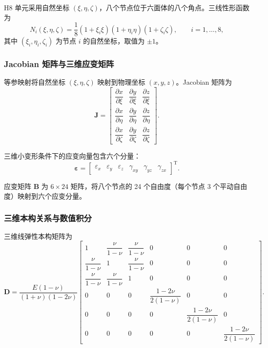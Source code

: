 \documentclass[UTF8,a4paper,zihao=-4]{ctexart}
\newcommand{\T}{\mathrm{T}}
\newcommand{\Dmat}{\bm{D}}
\newcommand{\Bmat}{\bm{B}}
\newcommand{\epsvec}{\bm{\varepsilon}}
\begin{document}
H8 单元采用自然坐标 $(\xi,\eta,\zeta)$，八个节点位于六面体的八个角点。三线性形函数为
\begin{equation}
    N_i(\xi,\eta,\zeta) = \frac{1}{8}(1+\xi_i\xi)(1+\eta_i\eta)(1+\zeta_i\zeta),
    \qquad i=1,\dots,8,
\end{equation}
其中 $(\xi_i,\eta_i,\zeta_i)$ 为节点 $i$ 的自然坐标，取值为 $\pm1$。

\subsubsection{Jacobian 矩阵与三维应变矩阵}

等参映射将自然坐标 $(\xi,\eta,\zeta)$ 映射到物理坐标 $(x,y,z)$。Jacobian 矩阵为
\begin{equation}
    \bm{J} =
    \begin{bmatrix}
        \dfrac{\partial x}{\partial \xi} &
        \dfrac{\partial y}{\partial \xi} &
        \dfrac{\partial z}{\partial \xi}\\[0.6em]
        \dfrac{\partial x}{\partial \eta} &
        \dfrac{\partial y}{\partial \eta} &
        \dfrac{\partial z}{\partial \eta}\\[0.6em]
        \dfrac{\partial x}{\partial \zeta} &
        \dfrac{\partial y}{\partial \zeta} &
        \dfrac{\partial z}{\partial \zeta}
    \end{bmatrix}.
\end{equation}

三维小变形条件下的应变向量包含六个分量：
\begin{equation}
    \epsvec =
    \begin{bmatrix}
        \varepsilon_x & \varepsilon_y & \varepsilon_z &
        \gamma_{xy} & \gamma_{yz} & \gamma_{zx}
    \end{bmatrix}^{\T}.
\end{equation}

应变矩阵 $\Bmat$ 为 $6\times24$ 矩阵，将八个节点的 24 个自由度（每个节点 3 个平动自由度）映射到六个应变分量。

\subsubsection{三维本构关系与数值积分}

三维线弹性本构矩阵为
\begin{equation}
    \Dmat =
    \frac{E(1-\nu)}{(1+\nu)(1-2\nu)}
    \begin{bmatrix}
        1 & \dfrac{\nu}{1-\nu} & \dfrac{\nu}{1-\nu} & 0 & 0 & 0\\[0.5em]
        \dfrac{\nu}{1-\nu} & 1 & \dfrac{\nu}{1-\nu} & 0 & 0 & 0\\[0.5em]
        \dfrac{\nu}{1-\nu} & \dfrac{\nu}{1-\nu} & 1 & 0 & 0 & 0\\[0.5em]
        0 & 0 & 0 & \dfrac{1-2\nu}{2(1-\nu)} & 0 & 0\\[0.5em]
        0 & 0 & 0 & 0 & \dfrac{1-2\nu}{2(1-\nu)} & 0\\[0.5em]
        0 & 0 & 0 & 0 & 0 & \dfrac{1-2\nu}{2(1-\nu)}
    \end{bmatrix}.
\end{equation}
\end{document}
